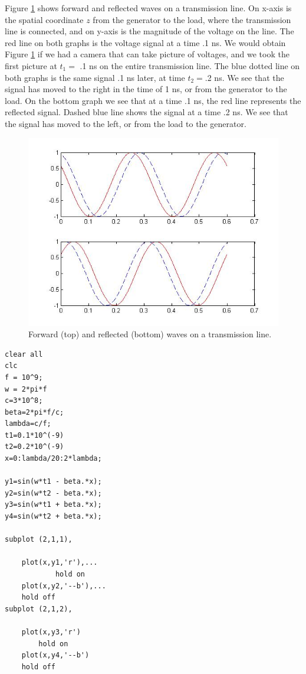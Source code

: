 \documentclass{ximera}
\begin{document}
Figure \ref{fwrdref}  shows forward and reflected waves on a transmission line. On x-axis is the spatial coordinate $z$ from the generator to the load, where the transmission line is connected,  and on y-axis is   the magnitude of the voltage on the line.   The red line on both graphs is the voltage signal at a time  .1 ns. We would obtain  Figure \ref{fwrdref} if we had a camera that can take picture of voltages, and we took the first picture at $t_1=$ .1 ns on the entire transmission line.  The blue dotted line on both graphs is the same signal .1 ns later,  at time $t_2=$.2  ns.  We see that the signal has moved to the right in the time of 1 ns, or from the generator to the load.  On the bottom graph we see that at a time .1 ns, the red line represents the  reflected signal.  Dashed blue line shows the signal  at a time .2 ns. We see  that  the signal has moved to the left, or  from the load to the generator. 


\begin{figure}[ht!]
\begin{center}
\includegraphics[scale=0.5]{../jpg/frwrdwave_01.jpg}
\caption{\label{fwrdref} Forward (top) and reflected (bottom) waves on a transmission line.}
\end{center}
\end{figure}


\begin{verbatim}
clear all
clc
f = 10^9;
w = 2*pi*f
c=3*10^8;
beta=2*pi*f/c;
lambda=c/f;
t1=0.1*10^(-9)
t2=0.2*10^(-9)
x=0:lambda/20:2*lambda;

y1=sin(w*t1 - beta.*x);
y2=sin(w*t2 - beta.*x);
y3=sin(w*t1 + beta.*x);
y4=sin(w*t2 + beta.*x);

subplot (2,1,1),

    plot(x,y1,'r'),...
            hold on
    plot(x,y2,'--b'),...
    hold off
subplot (2,1,2),

    plot(x,y3,'r')
        hold on
    plot(x,y4,'--b')
    hold off
\end{verbatim}
\end{document}

